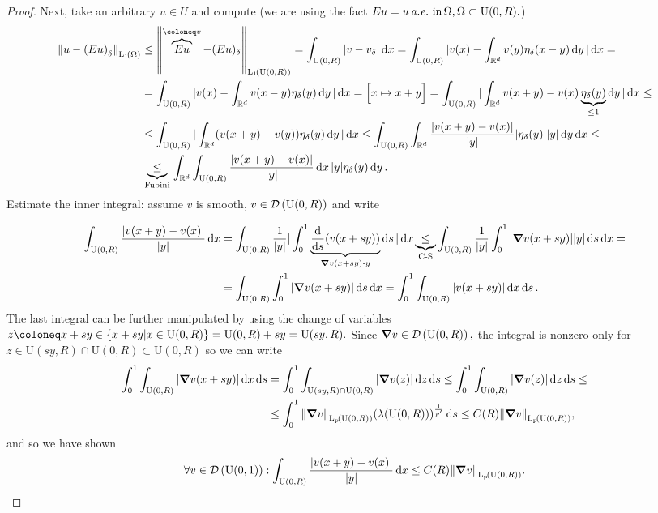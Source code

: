 \documentclass{article}
\begin{document}
\begin{proof}
	Next, take an arbitrary $u \in U$ and compute (we are using the fact $Eu = u \, \text{\textit{a.e.}} \, \, \text{in} \, \Omega, \Omega \subset \text{U}(0,R).$)
	\begin{align*}
		\norm{u-\qty(Eu)_{\delta}}_{\LpSet[1]{\Omega}} &\leq \norm{\overbrace{Eu}^{\coloneq v}-(Eu)_{\delta}}_{\LpSet[1]{\text{U}(0,R)}} = \int_{\text{U}(0,R)}|v-v_{\delta}|\dd{x} = \int_{\text{U}(0,R)}|v(x) - \int_{\R^d}v(y) \eta_{\delta}(x-y)\dd{y}|\dd{x}= \\
							       &=\int_{\text{U}(0,R)}|v(x) - \int_{\R^{d}}v(x-y)\eta_{\delta}(y)\dd{y}|\dd{x} = \Big[ x \mapsto x +y \Big] = \int_{\text{U}(0,R)}|\int_{\R^{d}}v(x+y) - v(x) \underbrace{\eta_{\delta}(y)}_{\leq 1}\dd{y}|\dd{x} \leq \\
							       &\leq \int_{\text{U}(0,R)}|\int_{\R^{d}}(v(x+y) - v(y))\eta_{\delta}(y)\dd{y}|\dd{x}\leq \int_{\text{U}(0,R)}\int_{\R^d}\frac{|v(x+y)-v(x)|}{|y|}|\eta_{\delta}(y)| |y| \dd{y}\dd{x}\leq \\
									& \underbrace{\leq}_{\, \text{Fubini} \,} \int_{\R^d}\int_{\text{U}(0,R)}\frac{|v(x+y)-v(x)|}{|y|}\dd{x}|y| \eta_{\delta}(y)\dd{y}.
	\end{align*}
	Estimate the inner integral: assume $v$ is smooth, $v \in \mathcal{D}\!\,\left(\text{U}(0,R) \right)$ and write

	\begin{align*}
		\int_{\text{U}(0,R)}\frac{|v(x+y) - v(x)|}{|y|}\dd{x} &= \int_{\text{U}(0,R)}\frac{1}{|y|}|\int_{0}^1 \underbrace{\dv{s} \qty(v(x+sy))}_{\grad v\qty(x+sy) \vdot y}\dd{s}|\dd{x} \underbrace{\leq}_{\, \text{C-S} \,} \int_{\text{U}(0,R)}\frac{1}{|y|}\int_{0}^1 |\grad v (x+sy)||y|\dd{s}\dd{x} =\\
								      &= \int_{\text{U}(0,R)}\int_0^1 |\grad v(x+sy)|\dd{s}\dd{x} = \int_{0}^1 \int_{\text{U}(0,R)}|v(x+sy)|\dd{x}\dd{s}. 
	\end{align*}
	The last integral can be further manipulated by using the change of variables $z \coloneq x + sy \in \qty{x + sy | x \in \text{U}(0,R)} = \text{U}(0,R) + sy = \text{U}(sy,R).$ Since $\grad v \in \mathcal{D}\!\,\left(\text{U}(0,R) \right),$ the integral is nonzero only for $z \in \text{U}(sy,R) \cap \text{U}(0,R) \subset \text{U}(0,R)$ so we can write
	\begin{align*}
		\int_0^1 \int_{\text{U}(0,R)}|\grad v(x+sy)|\dd{x}\dd{s} &= \int_0^1 \int_{\text{U}(sy,R) \cap \text{U}(0,R)}|\grad v(z)|\dd{z}\dd{s} \leq \int_0^1 \int_{\text{U}(0,R)}|\grad v(z)|\dd{z}\dd{s}\leq \\
									 &\leq \int_0^1 \norm{\grad v}_{\LpSet{\text{U}(0,R)}}\qty(\lambda\qty(\text{U}(0,R)))^{\frac{1}{p'}}\dd{s} \leq C(R) \norm{\grad v}_{\LpSet{\text{U}(0,R)}},
	\end{align*}
	and so we have shown
	\[
		\forall v \in \DSet{\text{U}(0,1)}: \int_{\text{U}(0,R)}\frac{|v(x+y)-v(x)|}{|y|}\dd{x} \leq C(R) \norm{\grad v}_{\LpSet{\text{U}(0,R)}}.
	\]
	

\end{proof}
\end{document}
